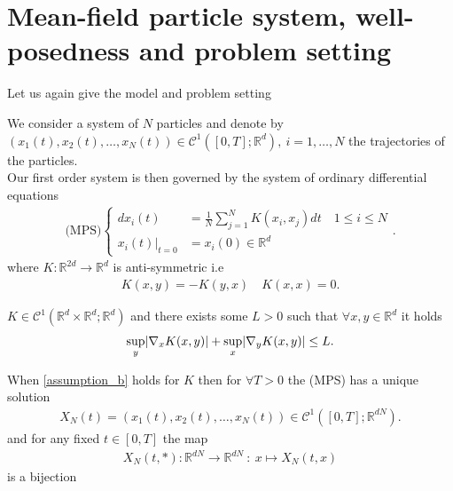 \section{Mean-field particle system, well-posedness and problem setting}
Let us again give the model and problem setting
\begin{definition}\label{first_order_system}
  We consider a system of $N$ particles and denote by $(x_{1}(t),x_{2}(t),\ldots,x_N(t)) \in  \mathcal{C}^{1}([0,T];\mathbb{R}^{d} ),\ i=1,\ldots ,N $ 
  the trajectories of the particles.\\[1ex]
  Our first order system is then governed by the system of ordinary differential equations 
  \begin{align*}
    \text{(MPS)}\begin{cases}
      d x_i(t) &= \frac{1}{N}\sum_{j=1}^{N} K(x_{i},x_{j}) dt  \quad 1\le i \le N \\
        x_i(t)\rvert_{t=0} &= x_i(0) \in \mathbb{R}^{d} 
    \end{cases}
  .\end{align*}
  where $K : \mathbb{R}^{2d} \to \mathbb{R}^{d}  $ is anti-symmetric i.e
  \begin{align*}
    K(x,y) = -K(y,x) \quad K(x,x) = 0
  .\end{align*}
\end{definition}
\begin{assumption}\label{assumption_b}
  $K \in  \mathcal{C}^{1}(\mathbb{R}^{d} \times \mathbb{R}^{d} ; \mathbb{R}^{d}   ) $ and there exists some $L>0$ such that
  $\forall x,y \in \mathbb{R}^{d} $ it holds 
  \begin{align*}
    \sup_y \lvert\nabla_x K(x,y)\rvert + \sup_x \lvert\nabla_yK(x,y)\rvert \le L
  .\end{align*}
\end{assumption}
\begin{lemma}
  When \autoref{assumption_b} holds for $K$ then for $\forall T>0$ the (MPS) has a unique solution 
  \begin{align*}
    X_N(t) = (x_{1}(t),x_{2}(t),\ldots ,x_{N}(t)) \in  \mathcal{C}^{1} ([0,T];\mathbb{R}^{dN} )
  .\end{align*}
  and for any fixed $t \in  [0,T]$ the map
  \begin{align*}
    X_N(t,*): \mathbb{R}^{dN} \to \mathbb{R}^{dN}  \ :\ x \mapsto X_N(t,x)
  \end{align*}
  is a bijection 
\end{lemma}
\newpage
\hspace{0mm}\\
